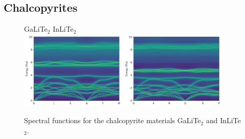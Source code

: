 \subsection{Chalcopyrites}
\begin{figure}
	\centering
	GaLiTe$_2$ \hspace{3.7cm} InLiTe$_2$\\
	\includegraphics[width=0.45\textwidth]{./data/plots/spectral_functions/122.04.GaLiTe2.png}
	\includegraphics[width=0.45\textwidth]{./data/plots/spectral_functions/122.04.InLiTe2.png}
	\caption{Spectral functions for the chalcopyrite materials GaLiTe$_2$ and InLiTe$_2$.}
	\label{fig:kappa_sigma}
\end{figure}

\cite{kuhn1985,kuhn1987,isaenko2005}


